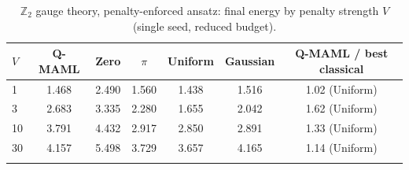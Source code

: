 \begin{table}[!htb]
\centering
\caption{$\mathbb{Z}_2$ gauge theory, penalty-enforced ansatz: final energy by penalty strength $V$ (single seed, reduced budget).}\label{tab:supp_vsweep}
\begin{tabular}{@{}lcccccc@{}}
\toprule
$V$ & Q-MAML & Zero & $\pi$ & Uniform & Gaussian & Q-MAML / best classical \\
\midrule
1 & 1.468 & 2.490 & 1.560 & 1.438 & 1.516 & 1.02 (Uniform) \\
3 & 2.683 & 3.335 & 2.280 & 1.655 & 2.042 & 1.62 (Uniform) \\
10 & 3.791 & 4.432 & 2.917 & 2.850 & 2.891 & 1.33 (Uniform) \\
30 & 4.157 & 5.498 & 3.729 & 3.657 & 4.165 & 1.14 (Uniform) \\
\botrule
\end{tabular}
\end{table}
